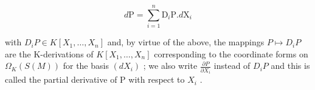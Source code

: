 \[
d \mathrm{P} = \sum_ {i = 1} ^ {n} \mathrm{D} _ {i} \mathrm{P}. d \mathrm{X} _ {i}
\]

with \(D_{i}P \in K[X_{1}, \ldots, X_{n}]\) and, by virtue of the above, the mappings \(P \mapsto D_{i}P\) are the K-derivations of \(K[X_{1}, \ldots, X_{n}]\) corresponding to the coordinate forms on \(\Omega_{K}(S(M))\) for the basis \((dX_{i})\) ; we also write \(\frac{\partial P}{\partial X_{i}}\) instead of \(D_{i}P\) and this is called the partial derivative of P with respect to \(X_{i}\) .

